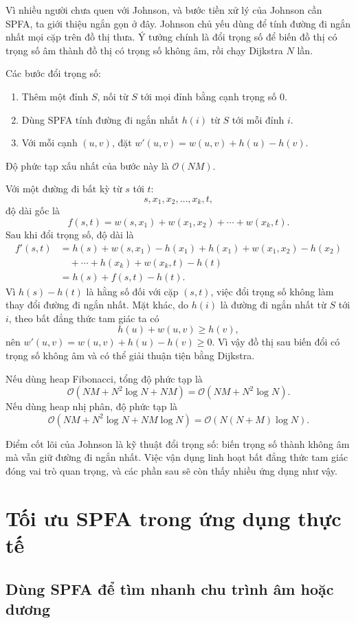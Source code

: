 \documentclass[11pt]{article}
\newcommand{\Oh}{\mathcal{O}}
\begin{document}
Vì nhiều người chưa quen với Johnson, và bước tiền xử lý của Johnson cần SPFA,
ta giới thiệu ngắn gọn ở đây. Johnson chủ yếu dùng để tính đường đi ngắn nhất
mọi cặp trên đồ thị thưa. Ý tưởng chính là đổi trọng số để biến đồ thị có
trọng số âm thành đồ thị có trọng số không âm, rồi chạy Dijkstra \(N\) lần.

Các bước đổi trọng số:
\begin{enumerate}
  \item Thêm một đỉnh \(S\), nối từ \(S\) tới mọi đỉnh bằng cạnh trọng số 0.
  \item Dùng SPFA tính đường đi ngắn nhất \(h(i)\) từ \(S\) tới mỗi đỉnh \(i\).
  \item Với mỗi cạnh \((u,v)\), đặt
  \(w'(u,v)=w(u,v)+h(u)-h(v)\).
\end{enumerate}
Độ phức tạp xấu nhất của bước này là \(\Oh(NM)\).

Với một đường đi bất kỳ từ \(s\) tới \(t\):
\[
  s,x_1,x_2,\ldots,x_k,t,
\]
độ dài gốc là
\[
  f(s,t)=w(s,x_1)+w(x_1,x_2)+\cdots+w(x_k,t).
\]
Sau khi đổi trọng số, độ dài là
\[
\begin{aligned}
  f'(s,t)
  &= h(s)+w(s,x_1)-h(x_1)+h(x_1)+w(x_1,x_2)-h(x_2) \\
  &\quad+\cdots+h(x_k)+w(x_k,t)-h(t) \\
  &= h(s)+f(s,t)-h(t).
\end{aligned}
\]
Vì \(h(s)-h(t)\) là hằng số đối với cặp \((s,t)\), việc đổi trọng số không
làm thay đổi đường đi ngắn nhất. Mặt khác, do \(h(i)\) là đường đi ngắn nhất
từ \(S\) tới \(i\), theo bất đẳng thức tam giác ta có
\[
  h(u)+w(u,v)\ge h(v),
\]
nên \(w'(u,v)=w(u,v)+h(u)-h(v)\ge 0\). Vì vậy đồ thị sau biến đổi có trọng số
không âm và có thể giải thuận tiện bằng Dijkstra.

Nếu dùng heap Fibonacci, tổng độ phức tạp là
\[
  \Oh(NM+N^2\log N+NM)=\Oh(NM+N^2\log N).
\]
Nếu dùng heap nhị phân, độ phức tạp là
\[
  \Oh(NM+N^2\log N+NM\log N)=\Oh(N(N+M)\log N).
\]

Điểm cốt lõi của Johnson là kỹ thuật đổi trọng số: biến trọng số thành không
âm mà vẫn giữ đường đi ngắn nhất. Việc vận dụng linh hoạt bất đẳng thức tam
giác đóng vai trò quan trọng, và các phần sau sẽ còn thấy nhiều ứng dụng như
vậy.

\section{Tối ưu SPFA trong ứng dụng thực tế}

\subsection{Dùng SPFA để tìm nhanh chu trình âm hoặc dương}
\end{document}
